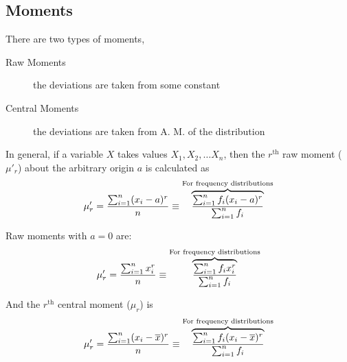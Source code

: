 \documentclass[
10pt, %
a4paper, %
]{report}
\begin{document}
\subsection*{Moments}
There are two types of moments,
\begin{description}
\item[Raw Moments] the deviations are taken from some constant
\item[Central Moments] the deviations are taken from A. M. of the distribution
\end{description}
In general, if a variable \(X\) takes values \(X_1, X_2, \dots X_n\),
then the \(r^\text{th}\) raw moment (\(\mu'_r\)) about the arbitrary origin \(a\) is calculated as
\[\mu'_r = \frac{\sum_{i=1}^{n} (x_i-a)^r}{n} \equiv \overbrace{\frac{\sum_{i=1}^{n} f_i  (x_i-a)^r}{\sum_{i=1}^{n} f_i}}^{\text{For frequency distributions}}\]

Raw moments with \(a=0\) are:
\[\mu'_r = \frac{\sum_{i=1}^{n} x_i^r}{n} \equiv \overbrace{\frac{\sum_{i=1}^{n} f_i  x_i^r}{\sum_{i=1}^{n} f_i}}^{\text{For frequency distributions}}\]

And the \(r^\text{th}\) central moment (\(\mu_r\)) is
\[\mu'_r = \frac{\sum_{i=1}^{n} (x_i-\overline{x})^r}{n} \equiv \overbrace{\frac{\sum_{i=1}^{n} f_i  (x_i-\overline{x})^r}{\sum_{i=1}^{n} f_i}}^{\text{For frequency distributions}}\]
\end{document}

